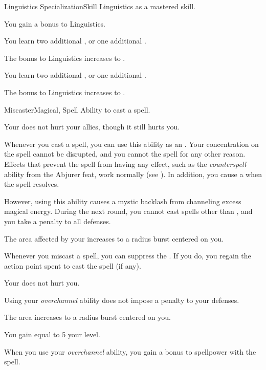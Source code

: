     \begin{feat}{Linguistics Specialization}{Skill}
        \featpre Linguistics as a mastered skill.
        \featben

         You gain a  bonus to Linguistics.

         You learn two additional , or one additional .

         The bonus to Linguistics increases to .

         You learn two additional , or one additional .

         The bonus to Linguistics increases to .
    \end{feat}

    \begin{feat}{Miscaster}{Magical, Spell}
        \featpre Ability to cast a spell.
        \featben

         Your  does not hurt your allies, though it still hurts you.

         Whenever you cast a spell, you can use this ability as an .
        Your concentration on the spell cannot be disrupted, and you cannot  the spell for any other reason.
        Effects that prevent the spell from having any effect, such as the \textit{counterspell} ability from the Abjurer feat, work normally (see ).
        In addition, you cause a  when the spell resolves.

        However, using this ability causes a mystic backlash from channeling excess magical energy.
        During the next round, you cannot cast spells other than , and you take a  penalty to all defenses.

         The area affected by your  increases to a \areasmall radius burst centered on you.

         Whenever you miscast a spell, you can suppress the .
        If you do, you regain the action point spent to cast the spell (if any).

         Your  does not hurt you.

         Using your \textit{overchannel} ability does not impose a penalty to your defenses.

         The area increases to a \areamed radius burst centered on you.

         You gain  equal to 5 \add your level.

         When you use your \textit{overchannel} ability, you gain a  bonus to spellpower with the spell.
    \end{feat}

